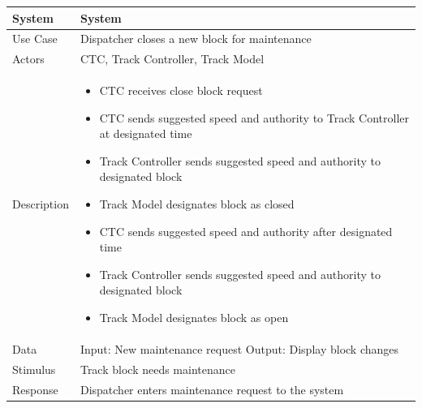 \documentclass{article}
\begin{document}
    \begin{longtable}{
    || >{\raggedright\arraybackslash}m{}
    | >{\raggedright\arraybackslash}m{}||}
    \hline
    \textbf{System} & \textbf{System} \\
    \hline
    Use Case & Dispatcher closes a new block for maintenance\\
    \hline
    Actors & CTC, Track Controller, Track Model\\
    \hline
    Description & \begin{itemize}
        \item CTC receives close block request
        \item CTC sends suggested speed and authority to Track Controller at designated time
        \item Track Controller sends suggested speed and authority to designated block
        \item Track Model designates block as closed
        \item CTC sends suggested speed and authority after designated time
        \item Track Controller sends suggested speed and authority to designated block
        \item Track Model designates block as open
    \end{itemize}\\
    \hline
    Data & Input: New maintenance request \newline Output: Display block changes\\
    \hline
    Stimulus & Track block needs maintenance\\
    \hline
    Response & Dispatcher enters maintenance request to the system\\
    \hline
    \end{longtable}
    
\end{document}
